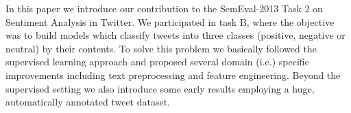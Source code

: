 In this paper we introduce our contribution to the SemEval-2013 Task 2 on Sentiment Analysis in Twitter. We participated in task B, where the objective
 was to build models which classify tweets into three classes (positive,
 negative or neutral) by their contents. To solve this problem we basically
 followed the supervised learning approach and proposed several domain
 (i.e.\textasciitildemicroblog) specific improvements including text preprocessing and feature
 engineering. Beyond the supervised setting we also introduce some early results
 employing a huge, automatically annotated tweet dataset.

